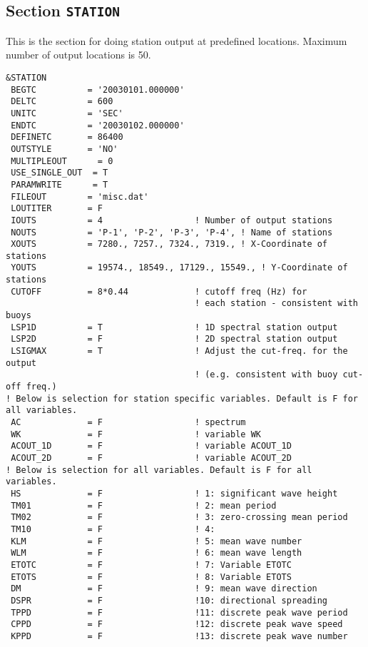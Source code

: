 \documentclass[12pt]{amsart}
\begin{document}
\newpage

\subsection{Section {\tt STATION}}
This is the section for doing station output at predefined locations. Maximum number of output locations is 50.
\begin{verbatim}
&STATION
 BEGTC          = '20030101.000000' 
 DELTC          = 600           
 UNITC          = 'SEC'         
 ENDTC          = '20030102.000000' 
 DEFINETC       = 86400     
 OUTSTYLE       = 'NO'     
 MULTIPLEOUT      = 0       
 USE_SINGLE_OUT  = T       
 PARAMWRITE      = T     
 FILEOUT        = 'misc.dat'
 LOUTITER       = F
 IOUTS          = 4                  ! Number of output stations
 NOUTS          = 'P-1', 'P-2', 'P-3', 'P-4', ! Name of stations
 XOUTS          = 7280., 7257., 7324., 7319., ! X-Coordinate of stations
 YOUTS          = 19574., 18549., 17129., 15549., ! Y-Coordinate of stations
 CUTOFF         = 8*0.44             ! cutoff freq (Hz) for
                                     ! each station - consistent with buoys
 LSP1D          = T                  ! 1D spectral station output
 LSP2D          = F                  ! 2D spectral station output
 LSIGMAX        = T                  ! Adjust the cut-freq. for the output
                                     ! (e.g. consistent with buoy cut-off freq.)
! Below is selection for station specific variables. Default is F for all variables.
 AC             = F                  ! spectrum 
 WK             = F                  ! variable WK
 ACOUT_1D       = F                  ! variable ACOUT_1D
 ACOUT_2D       = F                  ! variable ACOUT_2D
! Below is selection for all variables. Default is F for all variables.
 HS             = F                  ! 1: significant wave height
 TM01           = F                  ! 2: mean period
 TM02           = F                  ! 3: zero-crossing mean period
 TM10           = F                  ! 4: 
 KLM            = F                  ! 5: mean wave number
 WLM            = F                  ! 6: mean wave length
 ETOTC          = F                  ! 7: Variable ETOTC
 ETOTS          = F                  ! 8: Variable ETOTS
 DM             = F                  ! 9: mean wave direction
 DSPR           = F                  !10: directional spreading
 TPPD           = F                  !11: discrete peak wave period
 CPPD           = F                  !12: discrete peak wave speed
 KPPD           = F                  !13: discrete peak wave number

\end{verbatim}
\end{document}
